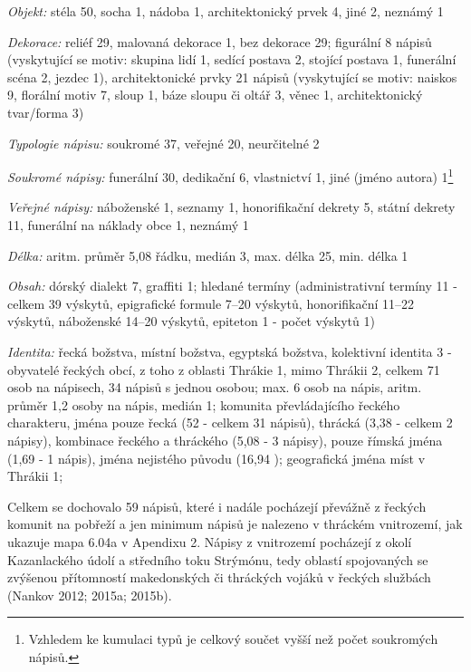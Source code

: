 {\em Objekt:} stéla 50, socha 1, nádoba 1, architektonický prvek 4, jiné 2, neznámý 1

{\em Dekorace:} reliéf 29, malovaná dekorace 1, bez dekorace 29; figurální 8 nápisů (vyskytující se motiv: skupina lidí 1, sedící postava 2, stojící postava 1, funerální scéna 2, jezdec 1), architektonické prvky 21 nápisů (vyskytující se motiv: naiskos 9, florální motiv 7, sloup 1, báze sloupu či oltář 3, věnec 1, architektonický tvar/forma 3)

{\em Typologie nápisu:} soukromé 37, veřejné 20, neurčitelné 2

{\em Soukromé nápisy:} funerální 30, dedikační 6, vlastnictví 1, jiné (jméno autora) 1\footnote{Vzhledem ke kumulaci typů je celkový součet vyšší než počet soukromých nápisů.}

{\em Veřejné nápisy:} náboženské 1, seznamy 1, honorifikační dekrety 5, státní dekrety 11, funerální na náklady obce 1, neznámý 1

{\em Délka:} aritm. průměr 5,08 řádku, medián 3, max. délka 25, min. délka 1

{\em Obsah:} dórský dialekt 7, graffiti 1; hledané termíny (administrativní termíny 11 - celkem 39 výskytů, epigrafické formule 7--20 výskytů, honorifikační 11--22 výskytů, náboženské 14--20 výskytů, epiteton 1 - počet výskytů 1)

{\em Identita:} řecká božstva, místní božstva, egyptská božstva, kolektivní identita 3 - obyvatelé řeckých obcí, z toho z oblasti Thrákie 1, mimo Thrákii 2, celkem 71 osob na nápisech, 34 nápisů s jednou osobou; max. 6 osob na nápis, aritm. průměr 1,2 osoby na nápis, medián 1; komunita převládajícího řeckého charakteru, jména pouze řecká (52  - celkem 31 nápisů), thrácká (3,38  - celkem 2 nápisy), kombinace řeckého a thráckého (5,08  - 3 nápisy), pouze římská jména (1,69  - 1 nápis), jména nejistého původu (16,94 ); geografická jména míst v Thrákii 1;

\NC\AR
\HL
\HL
\stoptable

Celkem se dochovalo 59 nápisů, které i nadále pocházejí převážně z řeckých komunit na pobřeží a jen minimum nápisů je nalezeno v thráckém vnitrozemí, jak ukazuje mapa 6.04a v Apendixu 2. Nápisy z vnitrozemí pocházejí z okolí Kazanlackého údolí a středního toku Strýmónu, tedy oblastí spojovaných se zvýšenou přítomností makedonských či thráckých vojáků v řeckých službách (Nankov 2012; 2015a; 2015b).

